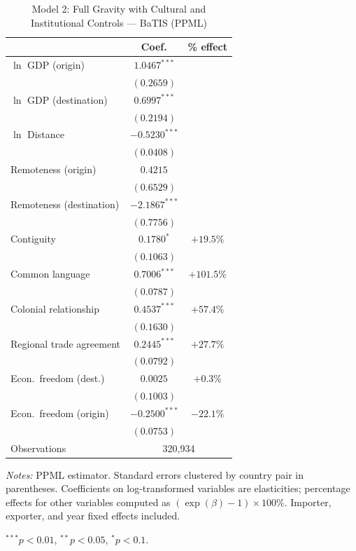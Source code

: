 \begin{table}[htbp]
\centering
\caption{Model 2: Full Gravity with Cultural and Institutional Controls --- BaTIS (PPML)}
\label{tab:batis_model2}
\small
\begin{tabular}{l cc}
\toprule
 & Coef. & \% effect \\
\midrule
$\ln$ GDP (origin) & $1.0467^{***}$ & \\
 & $(0.2659)$ & \\[4pt]
$\ln$ GDP (destination) & $0.6997^{***}$ & \\
 & $(0.2194)$ & \\[4pt]
$\ln$ Distance & $-0.5230^{***}$ & \\
 & $(0.0408)$ & \\[4pt]
Remoteness (origin) & $0.4215$ & \\
 & $(0.6529)$ & \\[4pt]
Remoteness (destination) & $-2.1867^{***}$ & \\
 & $(0.7756)$ & \\[4pt]
Contiguity & $0.1780^{*}$ & $+19.5\%$ \\
 & $(0.1063)$ & \\[4pt]
Common language & $0.7006^{***}$ & $+101.5\%$ \\
 & $(0.0787)$ & \\[4pt]
Colonial relationship & $0.4537^{***}$ & $+57.4\%$ \\
 & $(0.1630)$ & \\[4pt]
Regional trade agreement & $0.2445^{***}$ & $+27.7\%$ \\
 & $(0.0792)$ & \\[4pt]
Econ.\ freedom (dest.) & $0.0025$ & $+0.3\%$ \\
 & $(0.1003)$ & \\[4pt]
Econ.\ freedom (origin) & $-0.2500^{***}$ & $-22.1\%$ \\
 & $(0.0753)$ & \\[4pt]
\midrule
Observations & \multicolumn{2}{c}{320,934} \\
\bottomrule
\end{tabular}
\par\vspace{4pt}\noindent\begin{minipage}{\textwidth}
\footnotesize
\par \textit{Notes:} PPML estimator. Standard errors clustered by country pair in parentheses. Coefficients on log-transformed variables are elasticities; percentage effects for other variables computed as $(\exp(\beta)-1) \times 100\%$. Importer, exporter, and year fixed effects included.
\par $^{***}p<0.01$, $^{**}p<0.05$, $^{*}p<0.1$.
\end{minipage}
\end{table}

